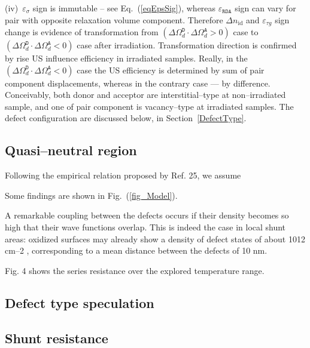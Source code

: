 \documentclass[aip,jap, amsmath,amssymb,reprint]{revtex4-1}
\begin{document}
\noindent
(iv)~$\varepsilon_{\sigma}$ sign is immutable -- see Eq.~(\ref{eqEpsSig}), 
whereas $\varepsilon_{\mathtt{RDA}}$ sign can vary for pair with opposite relaxation volume component.
Therefore $\Delta n_{\mathrm{id}}$ and $\varepsilon_{\tau g}$ sign change is evidence of transformation
from $(\Delta\Omega_d^\mathtt{D}\cdot\Delta\Omega_d^\mathtt{A}>0)$  case to
$(\Delta\Omega_d^\mathtt{D}\cdot\Delta\Omega_d^\mathtt{A}<0)$ case after irradiation.
Transformation direction is confirmed by rise US influence efficiency in irradiated samples.
Really, in the $(\Delta\Omega_d^\mathtt{D}\cdot\Delta\Omega_d^\mathtt{A}<0)$ case the US efficiency is determined by sum of pair component displacements,
whereas in the contrary case  --- by difference.
Conceivably, both donor and acceptor are interstitial--type at non--irradiated sample, and one of pair component is vacancy--type at irradiated samples.
The defect configuration are discussed below, in Section~\ref{DefectType}.


\subsection{Quasi--neutral region\label{Base}}

Following the empirical relation proposed by Ref. 25, we assume

Some findings are shown in  Fig.~(\ref{fig_Model}).


A remarkable coupling between the
defects occurs if their density becomes so high that their
wave functions overlap. This is indeed the case in local shunt
areas: oxidized surfaces may already show a density of
defect states of about 1012
cm–2
, corresponding to a mean
distance between the defects of 10 nm.




Fig. 4 shows the  series resistance  over the explored temperature range.

\subsection{Defect type speculation\label{DefectType}}

\subsection{Shunt resistance\label{Rsh}}
\end{document}
